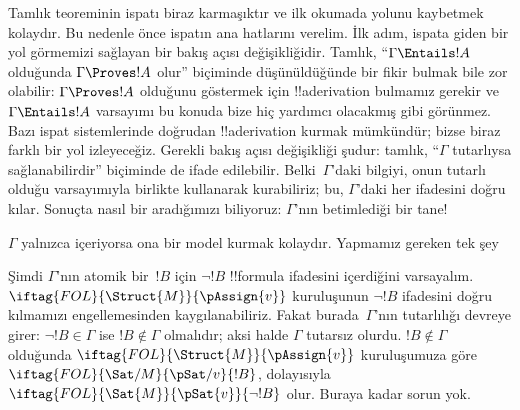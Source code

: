 \documentclass[../../../include/open-logic-section]{subfiles}
\begin{document}
      {}
      {}


Tamlık teoreminin ispatı biraz karmaşıktır ve ilk okumada yolunu
kaybetmek kolaydır. Bu nedenle önce ispatın ana hatlarını verelim. İlk
adım, ispata giden bir yol görmemizi sağlayan bir bakış açısı
değişikliğidir. Tamlık, ``$\Gamma \Entails !A$ olduğunda $\Gamma
\Proves !A$ olur'' biçiminde düşünüldüğünde bir fikir bulmak bile zor
olabilir: $\Gamma \Proves !A$ olduğunu göstermek için !!a{derivation}
bulmamız gerekir ve $\Gamma \Entails !A$ varsayımı bu konuda bize
hiç yardımcı olacakmış gibi görünmez. Bazı ispat sistemlerinde doğrudan
!!a{derivation} kurmak mümkündür; bizse biraz farklı bir yol izleyeceğiz.
Gerekli bakış açısı değişikliği şudur: tamlık, ``$\Gamma$ tutarlıysa
sağlanabilirdir'' biçiminde de ifade edilebilir. Belki~$\Gamma$'daki
bilgiyi, onun tutarlı olduğu varsayımıyla birlikte kullanarak
 kurabiliriz; bu,
$\Gamma$'daki her  ifadesini doğru
kılar. Sonuçta nasıl bir
 aradığımızı biliyoruz:
$\Gamma$'nın betimlediği bir tane!

$\Gamma$ yalnızca 
içeriyorsa ona bir model kurmak kolaydır. Yapmamız gereken tek şey

Şimdi $\Gamma$'nın atomik bir~$!B$ için $\lnot !B$ !!{formula}
ifadesini içerdiğini varsayalım. $\iftag{FOL}{\Struct{M}}{\pAssign{v}}$
kuruluşunun $\lnot !B$ ifadesini doğru kılmamızı engellemesinden
kaygılanabiliriz. Fakat burada~$\Gamma$'nın tutarlılığı devreye girer:
$\lnot !B\in\Gamma$ ise $!B\notin\Gamma$ olmalıdır; aksi halde
$\Gamma$ tutarsız olurdu. $!B\notin\Gamma$ olduğunda
$\iftag{FOL}{\Struct{M}}{\pAssign{v}}$ kuruluşumuza göre
$\iftag{FOL}{\Sat/{M}}{\pSat/{v}}{!B}$, dolayısıyla
$\iftag{FOL}{\Sat{M}}{\pSat{v}}{\lnot !B}$ olur. Buraya kadar sorun yok.
\end{document}
